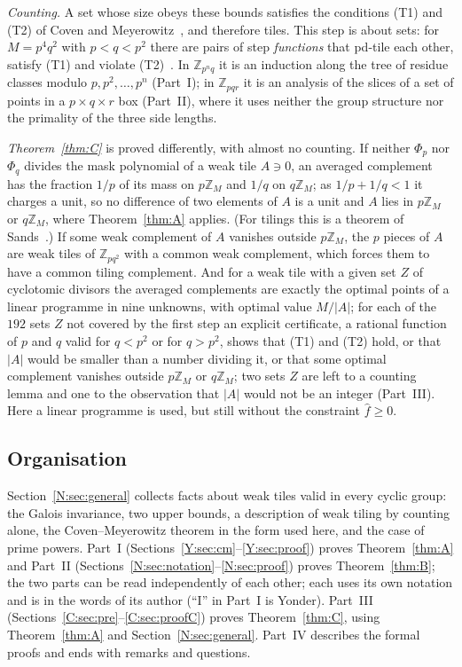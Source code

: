 \documentclass[11pt,a4paper]{amsart}
\theoremstyle{definition}
\theoremstyle{remark}
\newcommand{\Z}{\mathbb{Z}}
\begin{document}
\emph{Counting.} A set whose size obeys these bounds satisfies the conditions (T1) and (T2) of Coven and
Meyerowitz~\cite{CM}, and therefore tiles. This step is about sets: for $M=p^4q^2$ with $p<q<p^2$ there are pairs of
step \emph{functions} that pd-tile each other, satisfy (T1) and violate (T2)~\cite{KLMS}. In $\Z_{p^nq}$ it is an induction along
the tree of residue classes modulo $p,p^2,\dots,p^n$ (Part~I); in $\Z_{pqr}$ it is an analysis of the slices of
a set of points in a $p\times q\times r$ box (Part~II), where it uses neither the group structure nor the
primality of the three side lengths.

\emph{Theorem~\ref{thm:C}} is proved differently, with almost no counting. If neither $\Phi_p$ nor $\Phi_q$
divides the mask polynomial of a weak tile $A\ni0$, an averaged complement has the fraction $1/p$ of its mass on
$p\Z_M$ and $1/q$ on $q\Z_M$; as $1/p+1/q<1$ it charges a unit, so no difference of two elements of $A$ is a
unit and $A$ lies in $p\Z_M$ or $q\Z_M$, where Theorem~\ref{thm:A} applies. (For tilings this is a theorem of
Sands~\cite{Sa}.) If some weak complement of $A$ vanishes outside $p\Z_M$, the $p$ pieces of $A$ are weak tiles
of $\Z_{pq^2}$ with a common weak complement, which forces them to have a common tiling complement. And for a
weak tile with a given set $Z$ of cyclotomic divisors the averaged complements are exactly the optimal points of
a linear programme in nine unknowns, with optimal value $M/|A|$; for each of the $192$ sets $Z$ not covered by
the first step an explicit certificate, a rational function of $p$ and $q$ valid for $q<p^2$ or for $q>p^2$,
shows that (T1) and (T2) hold, or that $|A|$ would be smaller than a number dividing it, or that some optimal
complement vanishes outside $p\Z_M$ or $q\Z_M$; two sets $Z$ are left to a counting lemma and one to the
observation that $|A|$ would not be an integer (Part~III). Here a linear programme is used, but still without
the constraint $\hat f\ge0$.

\subsection*{Organisation} Section~\ref{N:sec:general} collects facts about weak tiles valid in every cyclic
group: the Galois invariance, two upper bounds, a description of weak tiling by counting alone, the
Coven--Meyerowitz theorem in the form used here, and the case of prime powers. Part~I
(Sections~\ref{Y:sec:cm}--\ref{Y:sec:proof}) proves Theorem~\ref{thm:A} and Part~II
(Sections~\ref{N:sec:notation}--\ref{N:sec:proof}) proves Theorem~\ref{thm:B}; the two parts can be read
independently of each other; each uses its own notation and is in the words of its author (``I'' in Part~I
is Yonder). Part~III (Sections~\ref{C:sec:pre}--\ref{C:sec:proofC}) proves Theorem~\ref{thm:C}, using
Theorem~\ref{thm:A} and Section~\ref{N:sec:general}. Part~IV describes the formal proofs and ends with
remarks and questions.
\end{document}
